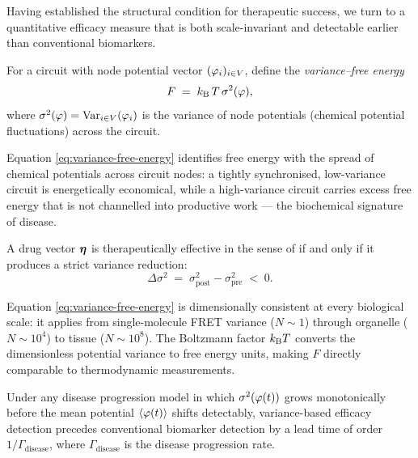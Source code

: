 Having established the structural condition for therapeutic success, we turn
to a quantitative efficacy measure that is both scale-invariant and detectable
earlier than conventional biomarkers.

\begin{definition}
\label{def:variance-free-energy}
For a circuit with node potential vector $(\varphi_i)_{i\in V}$, define
the \emph{variance--free energy}
\begin{equation}
  F \;=\; k_{\mathrm{B}}\,T\,\sigma^2(\varphi),
  \label{eq:variance-free-energy}
\end{equation}
where $\sigma^2(\varphi) = \mathrm{Var}_{i\in V}(\varphi_i)$ is
the variance of node potentials (chemical potential fluctuations) across the
circuit.
\end{definition}

Equation \eqref{eq:variance-free-energy} identifies free energy with the
spread of chemical potentials across circuit nodes: a tightly synchronised,
low-variance circuit is energetically economical, while a high-variance circuit
carries excess free energy that is not channelled into productive work — the
biochemical signature of disease.

\begin{proposition}
\label{prop:variance-efficacy}
A drug vector $\boldsymbol{\eta}$ is therapeutically effective in the sense of
 if and only if it produces a strict variance
reduction:
\begin{equation}
  \Delta\sigma^2 \;=\; \sigma^2_{\mathrm{post}} - \sigma^2_{\mathrm{pre}} \;<\; 0.
  \label{eq:variance-reduction}
\end{equation}
\end{proposition}

\begin{remark}
Equation \eqref{eq:variance-free-energy} is dimensionally consistent at every
biological scale: it applies from single-molecule FRET variance ($N \sim 1$)
through organelle ($N \sim 10^4$) to tissue ($N \sim 10^8$).  The Boltzmann
factor $k_{\mathrm{B}} T$ converts the dimensionless potential variance to free energy
units, making $F$ directly comparable to thermodynamic measurements.
\end{remark}

\begin{proposition}
\label{prop:variance-precedes-mean}
Under any disease progression model in which $\sigma^2(\varphi(t))$
grows monotonically before the mean potential $\langle\varphi(t)\rangle$
shifts detectably, variance-based efficacy detection precedes conventional
biomarker detection by a lead time of order $1/\Gamma_{\mathrm{disease}}$,
where $\Gamma_{\mathrm{disease}}$ is the disease progression rate.
\end{proposition}


